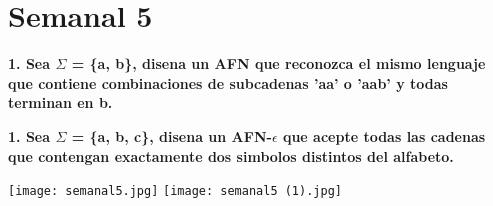\renewcommand{\labelenumi}{\alph{enumi})}
\section*{Semanal 5}
\textbf{1. Sea $\Sigma$ = \{a, b\}, 
disena un AFN que reconozca el mismo lenguaje que contiene
combinaciones de subcadenas 'aa' o 'aab' y todas terminan en b.}


\textbf{1. Sea $\Sigma$ = \{a, b, c\}, 
disena un AFN-$\epsilon$ que acepte todas las cadenas que contengan exactamente
dos simbolos distintos del alfabeto.}

\texttt{[image: semanal5.jpg]}
\texttt{[image: semanal5 (1).jpg]}
